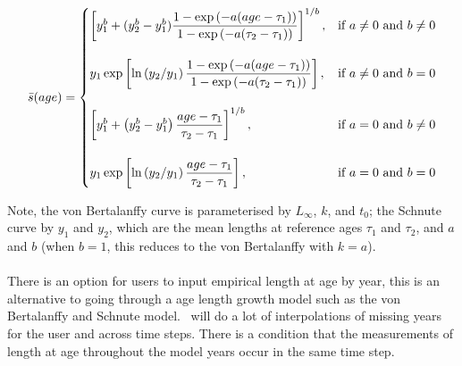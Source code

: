 \paragraph[Schnute]{}
\begin{equation}
\bar{s}(age)=\displaystyle\begin{cases}
  \left[ y_1^b + (y_2^b - y_1^b) \dfrac{1-\exp \left(-a(age - \tau_1) \right)}{1-\exp \left(-a(\tau_2 - \tau_1) \right)} \right]^{1/b}, & \text{if $a\ne0$ and $b\ne0$} \\
  \AddVspace
  y_1 \exp \left[ \ln \left( y_2 / y_1 \right) \dfrac{1-\exp \left(-a(age - \tau_1) \right)}{1-\exp \left(-a(\tau_2 - \tau_1) \right)} \right], & \text{if $a\ne0$ and $b=0$} \\
  \AddVspace
  \left[ y_1^b + \left( y_2^b - y_1^b \right) \dfrac{age-\tau_1}{\tau_2 - \tau_1} \right]^{1/b}, & \text{if $a=0$ and $b\ne0$} \\
  \AddVspace
  y_1 \exp \left[ \ln \left( y_2/y_1 \right) \dfrac{age-\tau_1}{\tau_2 - \tau_1} \right] , & \text{if $a=0$ and $b=0$} \\
  \end{cases}
\end{equation}

Note, the von Bertalanffy curve is parameterised by $L_\infty$, $k$, and $t_0$; the Schnute curve \citep{836} by $y_1$ and $y_2$, which are the mean lengths at reference ages $\tau_1$ and $\tau_2$, and $a$ and $b$ (when $b=1$, this reduces to the von Bertalanffy with $k=a$). 

\paragraph[Data]{}
There is an option for users to input empirical length at age by year, this is an alternative to going through a age length growth model such as the von Bertalanffy and Schnute model. \CNAME\ will do a lot of interpolations of missing years for the user and across time steps. There is a condition that the measurements of length at age throughout the model years occur in the same time step.

\subsection{\label{sec:mean-weight}}

